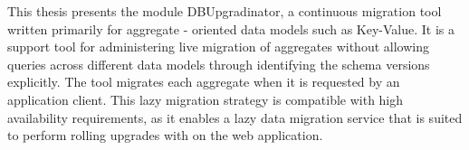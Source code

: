 This thesis presents the module DBUpgradinator, a continuous migration tool written primarily for aggregate - oriented data models such as Key-Value. It is a support tool for administering live migration of aggregates without allowing queries across different data models through identifying the schema versions explicitly. The tool migrates each aggregate when it is requested by an application client. This lazy migration strategy is compatible with high availability requirements, as it enables a lazy data migration service that is suited to perform rolling upgrades with on the web application.

\clearpage

